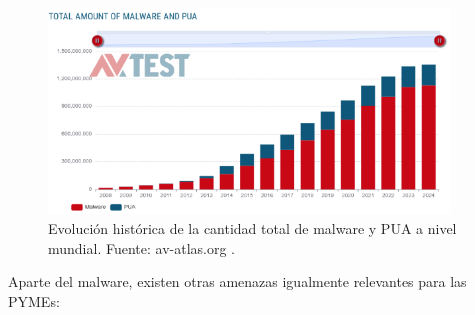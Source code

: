 \documentclass[a4paper, 10pt]{article}
\begin{document}
\begin{figure}[H]
    \centering
    \includegraphics[width=0.95\textwidth]{images/malware.png}
    \caption{Evolución histórica de la cantidad total de malware y PUA a nivel mundial. Fuente: av-atlas.org \cite{avtest}.}
\end{figure}

\vspace{0.5cm}

Aparte del malware, existen otras amenazas igualmente relevantes para las PYMEs:
\end{document}
